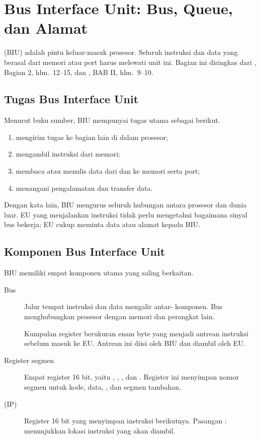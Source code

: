 \section{Bus Interface Unit: Bus, Queue, dan Alamat}
\label{sec:biu}

 (BIU) adalah pintu keluar-masuk prosesor.
Seluruh instruksi dan data yang berasal dari memori atau port harus
melewati unit ini. Bagian ini diringkas dari \cite{gunawan2019},
Bagian 2, hlm.~12--15, dan \cite{sto2001}, BAB II, hlm.~9--10.

\subsection{Tugas Bus Interface Unit}

Menurut buku sumber, BIU mempunyai tugas utama sebagai berikut.

\begin{enumerate}
    \item mengirim tugas ke bagian lain di dalam prosesor;
    \item mengambil instruksi dari memori;
    \item membaca atau menulis data dari dan ke memori serta port;
    \item menangani pengalamatan dan transfer data.
\end{enumerate}

Dengan kata lain, BIU mengurus seluruh hubungan antara prosesor dan
dunia luar. EU yang menjalankan instruksi tidak perlu mengetahui
bagaimana sinyal bus bekerja; EU cukup meminta data atau alamat
kepada BIU.

\subsection{Komponen Bus Interface Unit}

BIU memiliki empat komponen utama yang saling berkaitan.

\begin{description}
    \item[Bus] Jalur tempat instruksi dan data mengalir antar-
          komponen. Bus menghubungkan prosesor dengan memori dan
          perangkat lain.

    \item[] Kumpulan register berukuran enam byte yang
          menjadi antrean instruksi sebelum masuk ke EU. Antrean ini
          diisi oleh BIU dan diambil oleh EU.

    \item[Register segmen] Empat register 16 bit, yaitu ,
          , , dan . Register ini menyimpan
          nomor segmen untuk kode, data, , dan segmen
          tambahan.

    \item[ (IP)] Register 16 bit yang
          menyimpan  instruksi berikutnya. Pasangan
          : menunjukkan lokasi instruksi yang akan
          diambil.
\end{description}

